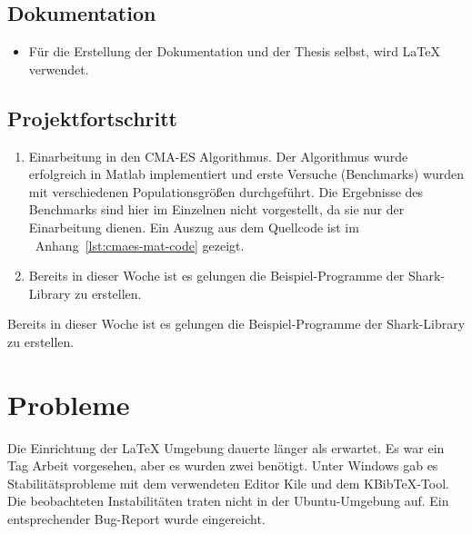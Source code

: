 \documentclass[a4paper,12pt,fleqn]{scrartcl}
\begin{document}
\subsection{Dokumentation}
\begin{itemize}
  \item Für die Erstellung der Dokumentation und der Thesis selbst, wird
      \LaTeX{} verwendet.

\end{itemize}

\subsection{Projektfortschritt}
\begin{enumerate}
 \item Einarbeitung in den CMA-ES Algorithmus. Der Algorithmus wurde erfolgreich
      in Matlab implementiert und erste Versuche (Benchmarks) wurden mit verschiedenen Populationsgrößen durchgeführt.
      Die Ergebnisse des Benchmarks sind hier im Einzelnen nicht vorgestellt, da sie nur der Einarbeitung dienen.
      Ein Auszug aus dem Quellcode ist im \ Anhang~\ref{lst:cmaes-mat-code} gezeigt.
 \item Bereits in dieser Woche ist es gelungen die Beispiel-Programme der Shark-Library zu erstellen.

\end{enumerate}

\cite{KALMANandSMOOTHING}
Bereits in dieser Woche ist es gelungen die Beispiel-Programme der Shark-Library
zu erstellen.


\section[Probleme]{Probleme}
Die Einrichtung der \LaTeX{} Umgebung dauerte länger als erwartet. Es war ein
Tag Arbeit vorgesehen, aber es wurden zwei benötigt.
Unter Windows gab es Stabilitätsprobleme mit dem verwendeten Editor Kile und dem KBibTeX-Tool.
Die beobachteten Instabilitäten traten nicht in der Ubuntu-Umgebung auf. Ein entsprechender Bug-Report wurde eingereicht.



\newpage
{}

\end{document}

